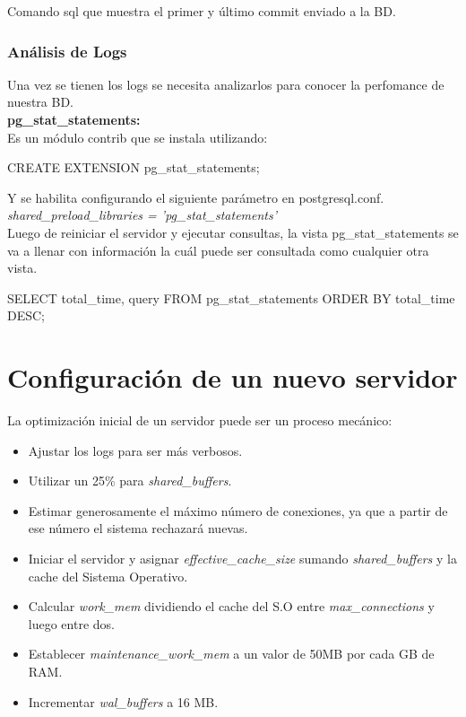 Comando sql que muestra el primer y último commit enviado a la BD.

\subsubsection{Análisis de Logs}

Una vez se tienen los logs se necesita analizarlos para conocer la perfomance de nuestra BD.\\

\textbf{pg\_stat\_statements:}\\

Es un módulo contrib que se instala utilizando:\\

\begin{pyglist}
CREATE EXTENSION pg_stat_statements;
\end{pyglist}

Y se habilita configurando el siguiente parámetro en postgresql.conf.\\

\emph{shared\_preload\_libraries = 'pg\_stat\_statements'} \\

Luego de reiniciar el servidor y ejecutar consultas, la vista pg\_stat\_statements se va a llenar con información la cuál puede ser consultada como cualquier otra vista.

\begin{pyglist}
SELECT total_time, query FROM pg_stat_statements ORDER BY total_time DESC;
\end{pyglist}


\section{Configuración de un nuevo servidor}

La optimización inicial de un servidor puede ser un proceso mecánico:

\begin{itemize}
\item Ajustar los logs para ser más verbosos.
\item Utilizar un 25\% para \textit{shared\_buffers}.
\item Estimar generosamente el máximo número de conexiones, ya que a partir de ese número el sistema rechazará nuevas.
\item Iniciar el servidor y asignar \textit{effective\_cache\_size} sumando \textit{shared\_buffers} y la cache del Sistema Operativo.
\item Calcular \textit{work\_mem} dividiendo el cache del S.O entre \textit{max\_connections} y luego entre dos.
\item Establecer \textit{maintenance\_work\_mem} a un valor de 50MB por cada GB de RAM.
\item Incrementar \textit{wal\_buffers} a 16 MB.
\end{itemize}

